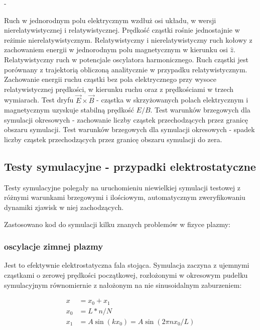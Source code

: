 \begin{enumerate}
        \itemi {} - 
            \begin{enumerate}
                \itemii Ruch w jednorodnym polu elektrycznym wzdłuż osi układu,
                    w wersji nierelatywistycznej i relatywistycznej. Prędkość cząstki rośnie
                    jednostajnie w reżimie nierelatywistycznym.
                \itemii Relatywistyczny i nierelatywistyczny ruch kołowy z
                    zachowaniem energii w jednorodnym polu magnetycznym w kierunku osi $\hat{z}$. 
                \itemii Relatywistyczny ruch w potencjale oscylatora harmonicznego. Ruch cząstki jest porównany
                    z trajektorią obliczoną analitycznie w przypadku relatywistycznym.
                \itemii Zachowanie energii ruchu cząstki bez pola elektrycznego przy wysoce relatywistycznej prędkości, w kierunku ruchu oraz z prędkościami
                    w trzech wymiarach.
                \itemii Test dryfu $\vec{E} \times \vec{B}$ - cząstka w skrzyżowanych polach elektrycznym i magnetycznym uzyskuje stabilną prędkość $E/B$.
                \itemii Test warunków brzegowych dla symulacji okresowych - zachowanie liczby cząstek przechodzących przez granicę obszaru symulacji.
                \itemii Test warunków brzegowych dla symulacji okresowych - spadek liczby cząstek przechodzących przez granicę obszaru symulacji do zera.
            \end{enumerate}
    \end{enumerate}

    \subsection{Testy symulacyjne - przypadki elektrostatyczne}
    Testy symulacyjne polegały na uruchomieniu niewielkiej symulacji testowej z
    różnymi warunkami brzegowymi i ilościowym, automatycznym zweryfikowaniu
    dynamiki zjawisk w niej zachodzących.

    Zastosowano kod do symulacji kilku znanych problemów w fizyce plazmy:
    \subsubsection{oscylacje zimnej plazmy}
    Jest to efektywnie elektrostatyczna fala stojąca. Symulacja zaczyna z ujemnymi cząstkami
o zerowej prędkości początkowej, rozłożonymi w okresowym pudełku symulacyjnym
równomiernie z nałożonym na nie sinusoidalnym zaburzeniem:

\begin{align}
x &= x_0 + x_1\\
x_0 &= L * n / N\\
x_1 &= A  \sin(k x_0) = A \sin(2 \pi n x_0 / L)
\end{align}

